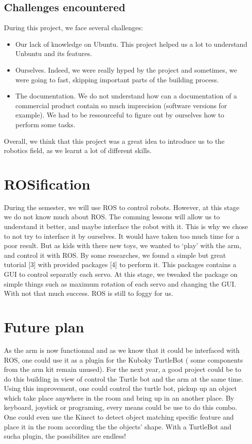 \documentclass[aps,letterpaper,11pt]{revtex4}
\begin{document}
\subsection{Challenges encountered}
During this project, we face several challenges:
\begin{itemize}
  \item Our lack of knowledge on Ubuntu. This project helped us a lot to understand Unbuntu and its features.
  \item Ourselves. Indeed, we were really hyped by the project and sometimes, we were going to fast, skipping important parts of the building process.
 \item The documentation. We do not understand how can a documentation of a commercial product contain so much imprecision (software versions for example). We had to be ressourceful to figure out by ourselves how to perform some tasks.
\end{itemize}

Overall, we think that this project was a great idea to introduce us to the robotics field, as we learnt a lot of different skills.

\section{ROSification}
During the semester, we will use ROS to control robots. However, at this stage we do not know much about ROS. The comming lessons will allow us to understand it better, and maybe interface the robot with it. This is why we chose to not try to interface it by ourselves. It would have taken too much time for a poor result. But as kids with there new toys, we wanted to `play' with the arm, and control it with ROS. By some researches, we found a simple but great tutorial [3] with provided packages [4] to perform it. This packages contains a GUI to control separatly each servo. At this stage, we tweaked the package on simple things such as maximum rotation of each servo and changing the GUI. With not that much success. ROS is still to foggy for us.

\section{Future plan}
As the arm is now functionnal and as we know that it could be interfaced with ROS, one could use it as a plugin for the Kuboky TurtleBot ( some components from the arm kit remain unused). For the next year, a good project could be to do this building in view of control the Turtle bot and the arm at the same time. Using this improvement, one could control the turtle bot, pickup up an object which take place anywhere in the room and bring up in an another place. By keyboard, joystick or programing, every means could be use to do this combo. One could even use the Kinect to detect object matching specific feature and place it in the room according the the objects' shape. With a TurtleBot and sucha  plugin, the possibilites are endless!
\end{document}
